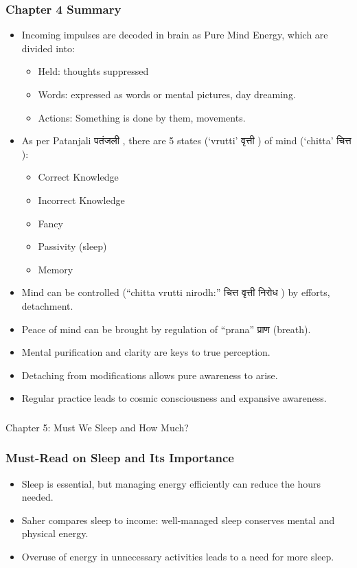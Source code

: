 \begin{frame}[fragile]\frametitle{Chapter 4 Summary}
	\begin{itemize}
	\item Incoming impulses are decoded in brain as Pure Mind Energy, which are divided into:
		\begin{itemize}
			\item Held: thoughts suppressed
			\item Words: expressed as words or mental pictures, day dreaming.
			\item Actions: Something is done by them, movements.
		\end{itemize}
	\item As per Patanjali पतंजली , there are 5 states (`vrutti' वृत्ती ) of mind (`chitta' चित्त ):
		\begin{itemize}
			\item Correct Knowledge
			\item Incorrect Knowledge
			\item Fancy
			\item Passivity (sleep)
			\item Memory
		\end{itemize}
	\item Mind can be controlled (``chitta vrutti nirodh:'' चित्त वृत्ती निरोध ) by efforts, detachment.
	\item Peace of mind can be brought by regulation of ``prana'' प्राण (breath).
	\item Mental purification and clarity are keys to true perception.
	\item Detaching from modifications allows pure awareness to arise.
	\item Regular practice leads to cosmic consciousness and expansive awareness.	
	\end{itemize}

\end{frame}

\begin{frame}[fragile]\frametitle{}
\begin{center}
{\Large Chapter 5: Must We Sleep and How Much?}
\end{center}
\end{frame}

\begin{frame}[fragile]\frametitle{Must-Read on Sleep and Its Importance}
    \begin{itemize}
        \item Sleep is essential, but managing energy efficiently can reduce the hours needed.
        \item Saher compares sleep to income: well-managed sleep conserves mental and physical energy.
        \item Overuse of energy in unnecessary activities leads to a need for more sleep.
    \end{itemize}
\end{frame}

